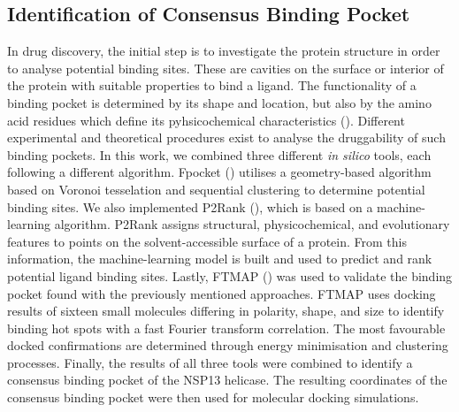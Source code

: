 \documentclass[11pt, letterpaper, titlepage]{article}
\renewcommand{\cite}{\parencite}
\begin{document}
\subsection{Identification of Consensus Binding Pocket}
In drug discovery, the initial step is to investigate the protein structure in order to analyse potential binding sites. These are cavities on the surface or interior of the protein with suitable properties to bind a ligand. The functionality of a binding pocket is determined by its shape and location, but also by the amino acid residues which define its pyhsicochemical characteristics (\cite{Stank_2016}). 
Different experimental and theoretical procedures exist to analyse the druggability of such binding pockets. In this work, we combined three different \textit{in silico} tools, each following a different algorithm. Fpocket (\cite{package_Fpocket}) utilises a geometry-based algorithm based on Voronoi tesselation and sequential clustering to determine potential binding sites. We also implemented P2Rank (\cite{package_P2Rank, package_PrankWeb, package_PrankWeb3}), which is based on a machine-learning algorithm. 
P2Rank assigns structural, physicochemical, and evolutionary features to points on the solvent-accessible surface of a protein. From this information, the machine-learning model is built and used to predict and rank potential ligand binding sites. Lastly, FTMAP (\cite{package_FTMAP}) was used to validate the binding pocket found with the previously mentioned approaches. FTMAP uses docking results of sixteen small molecules differing in polarity, shape, and size to identify binding hot spots with a fast Fourier transform correlation. The most favourable docked confirmations are determined through energy minimisation and clustering processes.
Finally, the results of all three tools were combined to identify a consensus binding pocket of the NSP13 helicase. The resulting coordinates of the consensus binding pocket were then used for molecular docking simulations. 
\end{document}
